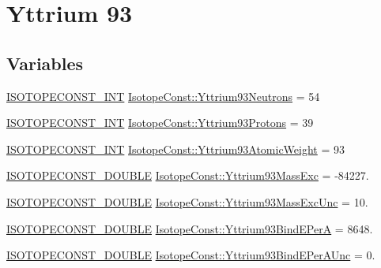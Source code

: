 \hypertarget{group___isotope_const-_yttrium-_y93}{}\section{Yttrium 93}
\label{group___isotope_const-_yttrium-_y93}
\subsection*{Variables}
\begin{DoxyCompactItemize}
\item 
\mbox{\hyperlink{group___isotope_const-_macros_ga5f18360b3e99483a35c32d789e62621c}{I\+S\+O\+T\+O\+P\+E\+C\+O\+N\+S\+T\+\_\+\+I\+NT}} \mbox{\hyperlink{group___isotope_const-_yttrium-_y93_ga27051185e370af4d378e5c43c8e3b0e2}{Isotope\+Const\+::\+Yttrium93\+Neutrons}} = 54
\item 
\mbox{\hyperlink{group___isotope_const-_macros_ga5f18360b3e99483a35c32d789e62621c}{I\+S\+O\+T\+O\+P\+E\+C\+O\+N\+S\+T\+\_\+\+I\+NT}} \mbox{\hyperlink{group___isotope_const-_yttrium-_y93_ga78e6d56cb8fbc0423fd77c2cee65ee7d}{Isotope\+Const\+::\+Yttrium93\+Protons}} = 39
\item 
\mbox{\hyperlink{group___isotope_const-_macros_ga5f18360b3e99483a35c32d789e62621c}{I\+S\+O\+T\+O\+P\+E\+C\+O\+N\+S\+T\+\_\+\+I\+NT}} \mbox{\hyperlink{group___isotope_const-_yttrium-_y93_ga103c4c6f06c98a4a3c57879a36da5a59}{Isotope\+Const\+::\+Yttrium93\+Atomic\+Weight}} = 93
\item 
\mbox{\hyperlink{group___isotope_const-_macros_ga8f45a7272ce02c0b4c65c44636ed719a}{I\+S\+O\+T\+O\+P\+E\+C\+O\+N\+S\+T\+\_\+\+D\+O\+U\+B\+LE}} \mbox{\hyperlink{group___isotope_const-_yttrium-_y93_ga0f3bc777d1d53f9fe1b6cccb83a4860f}{Isotope\+Const\+::\+Yttrium93\+Mass\+Exc}} = -\/84227.
\item 
\mbox{\hyperlink{group___isotope_const-_macros_ga8f45a7272ce02c0b4c65c44636ed719a}{I\+S\+O\+T\+O\+P\+E\+C\+O\+N\+S\+T\+\_\+\+D\+O\+U\+B\+LE}} \mbox{\hyperlink{group___isotope_const-_yttrium-_y93_ga82046aa6af0f80e0913f1eac13bdd475}{Isotope\+Const\+::\+Yttrium93\+Mass\+Exc\+Unc}} = 10.
\item 
\mbox{\hyperlink{group___isotope_const-_macros_ga8f45a7272ce02c0b4c65c44636ed719a}{I\+S\+O\+T\+O\+P\+E\+C\+O\+N\+S\+T\+\_\+\+D\+O\+U\+B\+LE}} \mbox{\hyperlink{group___isotope_const-_yttrium-_y93_gaa89526f746d1e34cca5606a2290def11}{Isotope\+Const\+::\+Yttrium93\+Bind\+E\+PerA}} = 8648.
\item 
\mbox{\hyperlink{group___isotope_const-_macros_ga8f45a7272ce02c0b4c65c44636ed719a}{I\+S\+O\+T\+O\+P\+E\+C\+O\+N\+S\+T\+\_\+\+D\+O\+U\+B\+LE}} \mbox{\hyperlink{group___isotope_const-_yttrium-_y93_ga962fd0cd7079679634a637b034132d53}{Isotope\+Const\+::\+Yttrium93\+Bind\+E\+Per\+A\+Unc}} = 0.

\end{DoxyCompactItemize}
